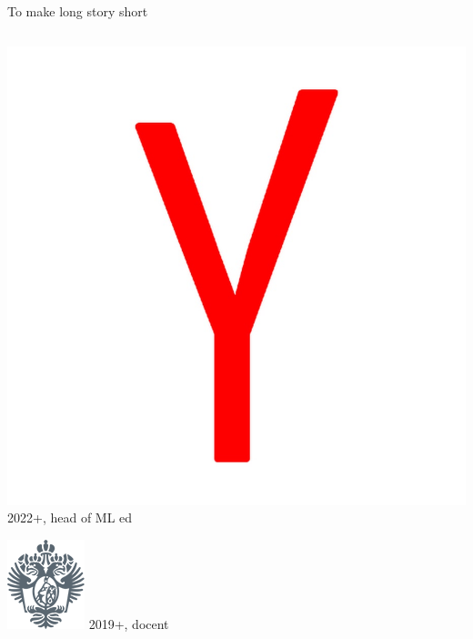 \documentclass[fullscreen=true, bookmarks=true, hyperref={pdfencoding=unicode}]{beamer}
\begin{document}
\begin{frame}{To make long story short}
\begin{columns}
\begin{column}{.15\paperwidth}
      \includegraphics[keepaspectratio,       width=.12\paperwidth]{yandex.jpg}
      2022+, head of ML ed

      \includegraphics[keepaspectratio,       width=.12\paperwidth]{spbu.png}
      2019+, docent
    \end{column}
\end{columns}
    
\end{frame}
\end{document}
